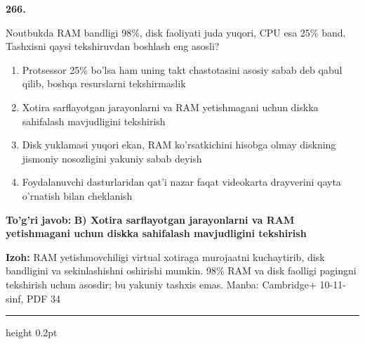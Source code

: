 \documentclass[10pt,a4paper]{article}
\begin{document}
{\bfseries\sffamily\color{ink} 266.}
\par
Noutbukda RAM bandligi 98\%, disk faoliyati juda yuqori, CPU esa 25\% band. Tashxisni qaysi tekshiruvdan boshlash eng asosli?
\begin{enumerate}[label=\Alph*),leftmargin=9mm]
\item Protsessor 25\% bo'lsa ham uning takt chastotasini asosiy sabab deb qabul qilib, boshqa resurslarni tekshirmaslik
\item Xotira sarflayotgan jarayonlarni va RAM yetishmagani uchun diskka sahifalash mavjudligini tekshirish
\item Disk yuklamasi yuqori ekan, RAM ko'rsatkichini hisobga olmay diskning jismoniy nosozligini yakuniy sabab deyish
\item Foydalanuvchi dasturlaridan qat'i nazar faqat videokarta drayverini qayta o'rnatish bilan cheklanish
\end{enumerate}
\begin{tcolorbox}[enhanced,breakable,colback=teal!4,colframe=teal!60!black,boxrule=0.45pt,arc=1.2mm,left=2.7mm,right=2.7mm,top=1.8mm,bottom=1.8mm,before skip=2mm,after skip=2mm]
{\bfseries\sffamily\color{teal}To'g'ri javob:} \textbf{B) Xotira sarflayotgan jarayonlarni va RAM yetishmagani uchun diskka sahifalash mavjudligini tekshirish}
\par\smallskip
{\bfseries Izoh:} RAM yetishmovchiligi virtual xotiraga murojaatni kuchaytirib, disk bandligini va sekinlashishni oshirishi mumkin. 98\% RAM va disk faolligi pagingni tekshirish uchun asosdir; bu yakuniy tashxis emas. Manba: Cambridge+ 10-11-sinf, PDF 34
\end{tcolorbox}
\vspace{2mm}\hrule height 0.2pt\vspace{3mm}
\end{document}
